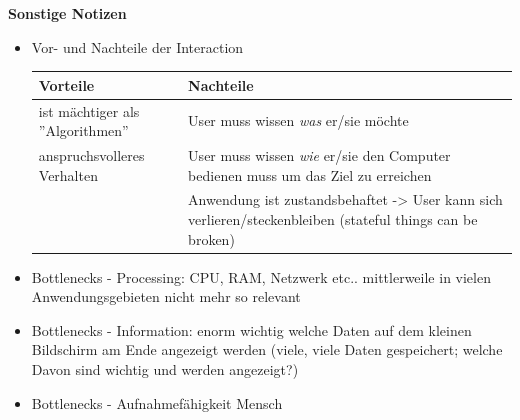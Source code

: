 \textbf{Sonstige Notizen}
\begin{itemize}
	\item Vor- und Nachteile der Interaction
	\begin{table}[!h]
		\centering
		\begin{tabular}{|p{20em}|p{20em}|}
			\hline
			\textbf{Vorteile} & \textbf{Nachteile}\\
			\hline
			\tabitem ist mächtiger als ''Algorithmen'' & \tabitem User muss wissen \textit{was} er/sie möchte\\
			\tabitem anspruchsvolleres Verhalten & \tabitem User muss wissen \textit{wie} er/sie den Computer bedienen muss um das Ziel zu erreichen\\
			 & \tabitem Anwendung ist zustandsbehaftet -> User kann sich verlieren/steckenbleiben (stateful things can be broken)\\
			\hline
		\end{tabular}
	\end{table}
	
	\item Bottlenecks - Processing: CPU, RAM, Netzwerk etc.. mittlerweile in vielen Anwendungsgebieten nicht mehr so relevant
	\item Bottlenecks - Information: enorm wichtig welche Daten auf dem kleinen Bildschirm am Ende angezeigt werden (viele, viele Daten gespeichert; welche Davon sind wichtig und werden angezeigt?)
	\item Bottlenecks - Aufnahmefähigkeit Mensch
\end{itemize}